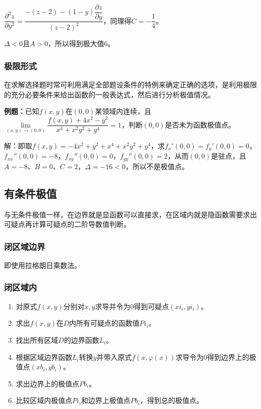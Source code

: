 \documentclass[UTF8, 12pt]{ctexart}
\begin{document}
$\dfrac{\partial^2z}{\partial y^2}=\dfrac{-(z-2)-(1-y)\dfrac{\partial z}{\partial y}}{(z-2)^2}$，同理得$C=-\dfrac{1}{4}$。

$\Delta<0$且$A>0$，所以得到极大值6。

\subsubsection{极限形式}

在求解选择题时常可利用满足全部题设条件的特例来确定正确的选项，是利用极限的充分必要条件来给出函数的一般表达式，然后进行分析极值情况。

\textbf{例题：}已知$f(x,y)$在$(0,0)$某领域内连续，且$\lim\limits_{(x,y)\to(0,0)}\dfrac{f(x,y)+4x^2-y^2}{x^4+x^2y^2+y^4}=1$，判断$(0,0)$是否未为函数极值点。

解：即取$f(x,y)=-4x^2+y^2+x^4+x^2y^2+y^4$，求$f_x'(0,0)=f_y'(0,0)=0$，$f_{xx}''(0,0)=-8$，$f_{xy}''(0,0)=0$，$f_{yy}''(0,0)=2$，从而$(0,0)$是驻点，且$A=-8$、$B=0$、$C=2$，$\Delta=-16<0$，所以不是极值点。

\subsection{有条件极值}

与无条件极值一样，在边界就是显函数可以直接求，在区域内就是隐函数需要求出可疑点再计算可疑点的二阶导数值判断。

\subsubsection{闭区域边界}

即使用拉格朗日乘数法。

\subsubsection{闭区域内}

\begin{enumerate}
    \item 对原式$f(x,y)$分别对$x,y$求导并令为0得到可疑点$(xi_i,yi_i)$。
    \item 求出$f(x,y)$在$D$内所有可疑点的函数值$Pi_i$。
    \item 找出所有区域$D$的边界函数$L_i$。
    \item 根据区域边界函数$L_i$转换$y$并带入原式$f(x,\varphi(x))$求导令为0得到边界上的极值点$(xb_i,yb_i)$。
    \item 求出边界上的极值点$Pb_i$。
    \item 比较区域内极值点$Pi_i$和边界上极值点$Pb_i$，得到总的极值点。
\end{enumerate}
\end{document}
